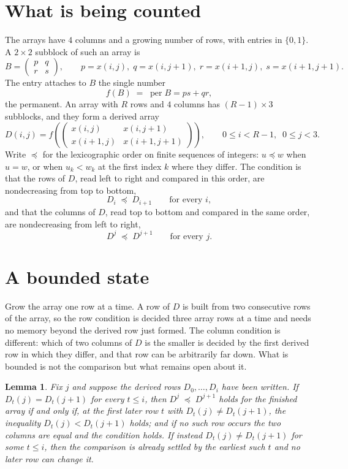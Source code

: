 \documentclass[11pt,a4paper]{article}
\theoremstyle{plain}
\newtheorem{lemma}[theorem]{Lemma}
\theoremstyle{definition}
\begin{document}
\section{What is being counted}

The arrays have $4$ columns and a growing number of rows, with entries in $\{0,1\}$. A
$2\times2$ subblock of such an array is
\[
B=\begin{pmatrix} p & q \\ r & s \end{pmatrix},
\qquad p=x(i,j),\; q=x(i,j+1),\; r=x(i+1,j),\; s=x(i+1,j+1).
\]
The entry attaches to $B$ the single number
\[
f(B)\;=\;\operatorname{per}B=ps+qr,
\]
the permanent. An array with $R$ rows and $4$ columns has $(R-1)\times3$ subblocks, and they
form a derived array
\[
D(i,j)=f\!\left(\begin{pmatrix} x(i,j) & x(i,j+1) \\ x(i+1,j) & x(i+1,j+1)\end{pmatrix}
\right),\qquad 0\le i<R-1,\;\; 0\le j<3 .
\]
Write $\preceq$ for the lexicographic order on finite sequences of integers: $u\preceq w$ when
$u=w$, or when $u_k<w_k$ at the first index $k$ where they differ. The condition is that the
rows of $D$, read left to right and compared in this order, are nondecreasing from top to bottom,
\[
D_{i}\;\preceq\;D_{i+1}\qquad\text{for every } i,
\]
and that the columns of $D$, read top to bottom and compared in the same order, are nondecreasing
from left to right,
\[
D^{j}\;\preceq\;D^{j+1}\qquad\text{for every } j .
\]

\section{A bounded state}

Grow the array one row at a time. A row of $D$ is built from two consecutive rows of the array,
so the row condition is decided three array rows at a time and needs no memory beyond the
derived row just formed. The column condition is different: which of two columns of $D$ is the
smaller is decided by the first derived row in which they differ, and that row can be
arbitrarily far down. What is bounded is not the comparison but what remains open about it.

\begin{lemma}\label{lem:bits}
Fix $j$ and suppose the derived rows $D_0,\dots,D_i$ have been written. If $D_t(j)=D_t(j+1)$ for
every $t\le i$, then $D^{j}\;\preceq\;D^{j+1}$ holds for the finished array if and only if,
at the first later row $t$ with $D_t(j)\neq D_t(j+1)$, the inequality $D_t(j)<D_t(j+1)$
holds; and if no such row occurs the two columns are equal and the condition holds. If instead
$D_t(j)\neq D_t(j+1)$ for some $t\le i$, then the comparison is already settled by the earliest
such $t$ and no later row can change it.
\end{lemma}
\end{document}
